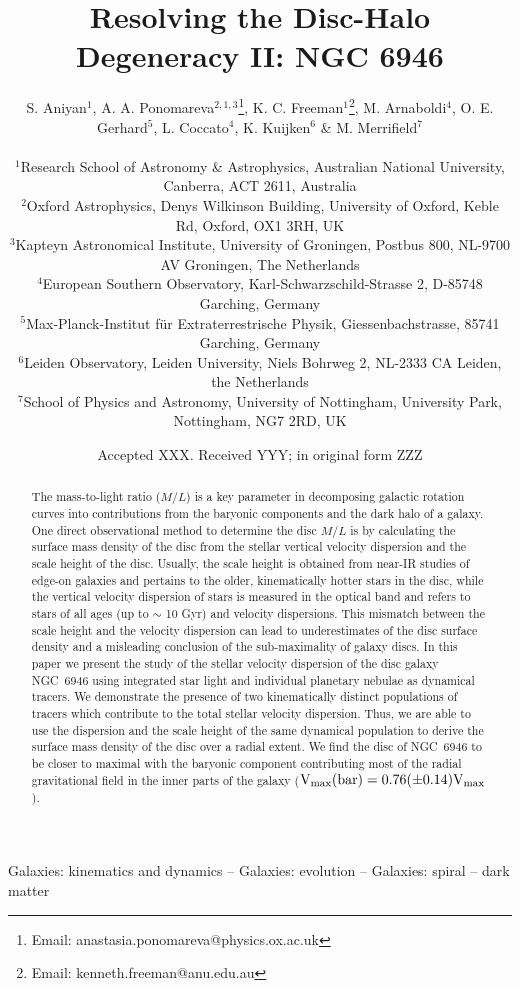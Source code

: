 \documentclass[fleqn,usenatbib]{mnras}
\title[Resolving the Disc-Halo Degeneracy: NGC 6946]{Resolving the Disc-Halo Degeneracy II: NGC 6946}
\author[S. Aniyan, A.A. Ponomareva, K.C. Freeman et al.]
{\parbox{\textwidth}{S. Aniyan$^1$, A. A. Ponomareva$^{2,1,3}$\thanks{Email: anastasia.ponomareva@physics.ox.ac.uk}, K. C. Freeman$^1$\thanks{Email: kenneth.freeman@anu.edu.au}, M. Arnaboldi$^{4}$, O. E. Gerhard$^5$, L. Coccato$^4$, K. Kuijken$^6$ \& M. Merrifield$^7$ }\vspace{0.4cm}\\  
$^1$Research School of Astronomy \& Astrophysics, Australian National University, Canberra, ACT 2611, Australia \\
$^2$Oxford Astrophysics, Denys Wilkinson Building, University of Oxford, Keble Rd, Oxford, OX1 3RH, UK\\
$^3$Kapteyn Astronomical Institute, University of Groningen, Postbus 800, NL-9700 AV Groningen, The Netherlands \\
$^4$European Southern Observatory, Karl-Schwarzschild-Strasse 2, D-85748 Garching, Germany\\
$^5$Max-Planck-Institut f{\"u}r Extraterrestrische Physik, Giessenbachstrasse, 85741 Garching, Germany \\
$^6$Leiden Observatory, Leiden University, Niels Bohrweg 2, NL-2333 CA Leiden, the Netherlands \\
$^7$School of Physics and Astronomy, University of Nottingham, University Park, Nottingham, NG7 2RD, UK}
\date{Accepted XXX. Received YYY; in original form ZZZ}
\begin{document}
\label{firstpage}
\pagerange{\pageref{firstpage}--\pageref{lastpage}}
\maketitle

\begin{abstract}
The mass-to-light ratio ($M/L$) is a key parameter in decomposing galactic rotation curves into contributions from the baryonic components and the dark halo of a galaxy. One direct observational method to determine the %
disc %
$M/L$ is by calculating the surface mass density of the disc  %
from the stellar vertical velocity dispersion and the scale height of the disc. Usually, the scale height is obtained from near-IR studies of edge-on galaxies %
and pertains  %
to the older, kinematically hotter stars in the disc, while the vertical velocity dispersion of stars is measured in the optical band and refers to stars of all ages (up to $\sim$ 10 Gyr) %
and velocity dispersions. This mismatch between the scale height and the velocity dispersion can %
lead to underestimates of the disc surface density and %
a misleading conclusion of the sub-maximality of galaxy discs. In this paper we present the study of the stellar velocity dispersion of the 
disc galaxy NGC~6946 using integrated star light %
and individual planetary nebulae as dynamical tracers. %
We demonstrate the presence of two kinematically distinct populations of tracers which contribute to the total stellar velocity dispersion. Thus, we %
are able to use the dispersion and the scale height of the same %
dynamical %
population to derive %
the surface mass density %
of the disc %
over a radial extent. %
We find the disc of NGC~6946 to be closer to maximal with the baryonic component contributing  
most of the radial gravitational field in the inner parts of the galaxy  ($\rm V_{max}(bar)=0.76(\pm0.14)V_{max}$).

\end{abstract}

\begin{keywords}
 Galaxies: kinematics and dynamics -- Galaxies: evolution -- Galaxies: spiral -- dark matter

\end{keywords}

\end{document}

